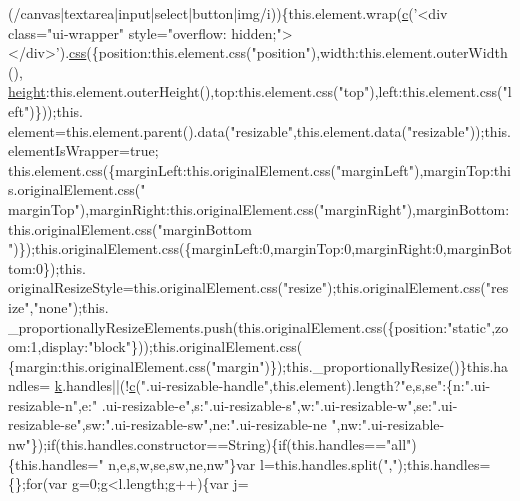 \begin{DoxyCode}
      (/canvas|textarea|input|select|button|img/i))\{this.element.wrap(\hyperlink{jquery_8js_ad171626e81625b5e9f5cb177a3a8fb1c}{c}(\textcolor{stringliteral}{'<div class="ui-wrapper" style="overflow:
       hidden;"></div>'}).\hyperlink{jquery_8js_a89ad527fcd82c01ebb587332f5b4fcd4}{css}(\{position:this.element.css(\textcolor{stringliteral}{"position"}),width:this.element.outerWidth(),
      \hyperlink{styr_2styr_2main_8c_a48083b65ac9a863566dc3e3fff09a5b4}{height}:this.element.outerHeight(),top:this.element.css(\textcolor{stringliteral}{"top"}),left:this.element.css(\textcolor{stringliteral}{"left"})\}));this.
      element=this.element.parent().data(\textcolor{stringliteral}{"resizable"},this.element.data(\textcolor{stringliteral}{"resizable"}));this.elementIsWrapper=\textcolor{keyword}{true};
      this.element.css(\{marginLeft:this.originalElement.css(\textcolor{stringliteral}{"marginLeft"}),marginTop:this.originalElement.css(\textcolor{stringliteral}{"
      marginTop"}),marginRight:this.originalElement.css(\textcolor{stringliteral}{"marginRight"}),marginBottom:this.originalElement.css(\textcolor{stringliteral}{"marginBottom
      "})\});this.originalElement.css(\{marginLeft:0,marginTop:0,marginRight:0,marginBottom:0\});this.
      originalResizeStyle=this.originalElement.css(\textcolor{stringliteral}{"resize"});this.originalElement.css(\textcolor{stringliteral}{"resize"},\textcolor{stringliteral}{"none"});this.
      \_proportionallyResizeElements.push(this.originalElement.css(\{position:\textcolor{stringliteral}{"static"},zoom:1,display:\textcolor{stringliteral}{"block"}\}));this.originalElement.css(
      \{margin:this.originalElement.css(\textcolor{stringliteral}{"margin"})\});this.\_proportionallyResize()\}this.handles=
      \hyperlink{jquery_8js_ab26645c014aa005ecedef329ecf58c99}{k}.handles||(!\hyperlink{jquery_8js_ad171626e81625b5e9f5cb177a3a8fb1c}{c}(\textcolor{stringliteral}{".ui-resizable-handle"},this.element).length?\textcolor{stringliteral}{"e,s,se"}:\{n:\textcolor{stringliteral}{".ui-resizable-n"},e:\textcolor{stringliteral}{"
      .ui-resizable-e"},s:\textcolor{stringliteral}{".ui-resizable-s"},w:\textcolor{stringliteral}{".ui-resizable-w"},se:\textcolor{stringliteral}{".ui-resizable-se"},sw:\textcolor{stringliteral}{".ui-resizable-sw"},ne:\textcolor{stringliteral}{".ui-resizable-ne
      "},nw:\textcolor{stringliteral}{".ui-resizable-nw"}\});\textcolor{keywordflow}{if}(this.handles.constructor==String)\{\textcolor{keywordflow}{if}(this.handles==\textcolor{stringliteral}{"all"})\{this.handles=\textcolor{stringliteral}{"
      n,e,s,w,se,sw,ne,nw"}\}var l=this.handles.split(\textcolor{stringliteral}{","});this.handles=\{\};\textcolor{keywordflow}{for}(var g=0;g<l.length;g++)\{var j=

\end{DoxyCode}

